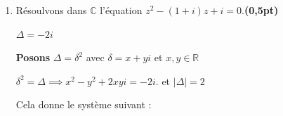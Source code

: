 \documentclass[12pt,a4paper]{article}
\begin{document}
\begin{enumerate}

\item Résoulvons dans \( \mathbb{C} \) l’équation \( z^2 - (1 + i)z + i = 0 \).\hfill \textbf{(0,5pt)}

\( \Delta = -2i \)


 { \textbf{Posons} \( \Delta = \delta^2 \) } avec \(  \delta = x + yi \) et \( x, y \in \mathbb{R} \)
 
\(
 \delta^2 = \Delta \implies  x^2 - y^2 + 2xyi = -2i.
\)
et $| \Delta | = 2$

Cela donne le système suivant :


\end{enumerate}
\end{document}
